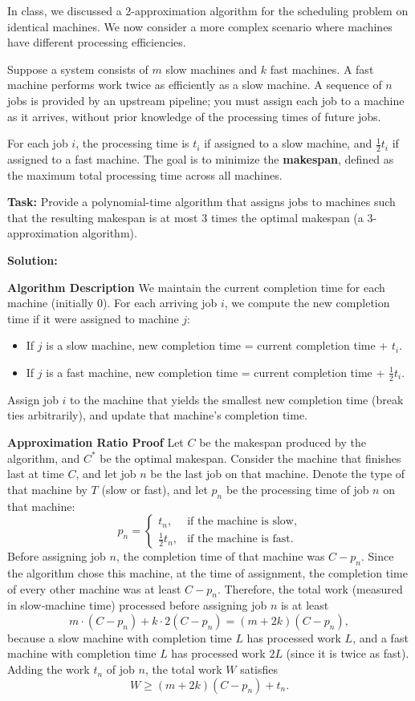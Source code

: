 \problem{}
In class, we discussed a 2-approximation algorithm for the scheduling problem on identical machines. We now consider a more complex scenario where machines have different processing efficiencies. 

Suppose a system consists of $m$ slow machines and $k$ fast machines. A fast machine performs work twice as efficiently as a slow machine. A sequence of $n$ jobs is provided by an upstream pipeline; you must assign each job to a machine as it arrives, without prior knowledge of the processing times of future jobs. 

For each job $i$, the processing time is $t_i$ if assigned to a slow machine, and $\frac{1}{2}t_i$ if assigned to a fast machine. The goal is to minimize the \textbf{makespan}, defined as the maximum total processing time across all machines.

\textbf{Task:} Provide a polynomial-time algorithm that assigns jobs to machines such that the resulting makespan is at most 3 times the optimal makespan (a 3-approximation algorithm).

\noindent \textbf{Solution:}


\textbf{Algorithm Description}
We maintain the current completion time for each machine (initially 0). For each arriving job $i$, we compute the new completion time if it were assigned to machine $j$:
\begin{itemize}
    \item If $j$ is a slow machine, new completion time = current completion time + $t_i$.
    \item If $j$ is a fast machine, new completion time = current completion time + $\frac{1}{2} t_i$.
\end{itemize}
Assign job $i$ to the machine that yields the smallest new completion time (break ties arbitrarily), and update that machine's completion time.

\textbf{Approximation Ratio Proof}
Let $C$ be the makespan produced by the algorithm, and $C^*$ be the optimal makespan. Consider the machine that finishes last at time $C$, and let job $n$ be the last job on that machine. Denote the type of that machine by $T$ (slow or fast), and let $p_n$ be the processing time of job $n$ on that machine:
\[
p_n = \begin{cases}
t_n, & \text{if the machine is slow},\\
\frac{1}{2}t_n, & \text{if the machine is fast}.
\end{cases}
\]
Before assigning job $n$, the completion time of that machine was $C - p_n$. Since the algorithm chose this machine, at the time of assignment, the completion time of every other machine was at least $C - p_n$. Therefore, the total work (measured in slow‑machine time) processed before assigning job $n$ is at least
\[
m \cdot (C - p_n) + k \cdot 2(C - p_n) = (m+2k)(C - p_n),
\]
because a slow machine with completion time $L$ has processed work $L$, and a fast machine with completion time $L$ has processed work $2L$ (since it is twice as fast). Adding the work $t_n$ of job $n$, the total work $W$ satisfies
\[
W \ge (m+2k)(C - p_n) + t_n.
\]

